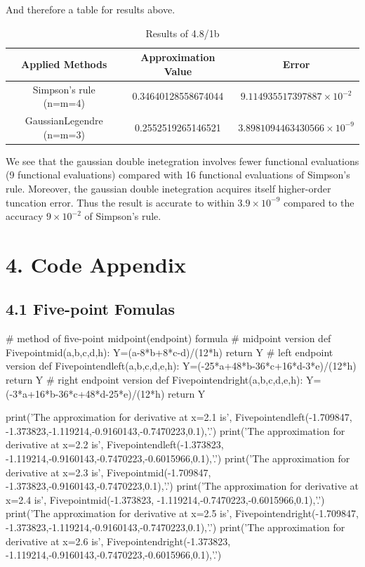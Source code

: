 \documentclass{article}
\begin{document}
    And therefore a table for results above. 

    \begin{table}[htbp]
    \centering
    \caption{Results of 4.8/1b}
    \begin{tabular}{c|c|c}
    \toprule
    \textbf{Applied Methods} & \textbf{Approximation Value } & \textbf{Error}\\ 
    \midrule
    Simpson's rule (n=m=4)& 0.34640128558674044 &$9.114935517397887 \times 10^{-2}$\\
    GaussianLegendre (n=m=3)&0.2552519265146521& $3.8981094463430566\times 10^{-9}$\\
    \bottomrule
    \end{tabular}
    \end{table}

    We see that the gaussian double inetegration involves fewer functional evaluations (9 functional evaluations) compared with 16 functional evaluations of Simpson's rule. Moreover, the gaussian double inetegration acquires itself higher-order tuncation error. Thus the result is accurate to within $3.9\times 10^{-9}$ compared to the accuracy $9\times 10^{-2}$ of Simpson's rule.

\section{4. Code Appendix}
    \subsection{4.1 Five-point Fomulas}
    \begin{python}
    # method of five-point midpoint(endpoint) formula
    # midpoint version
    def Fivepointmid(a,b,c,d,h):
        Y=(a-8*b+8*c-d)/(12*h)
        return Y
    # left endpoint version
    def Fivepointendleft(a,b,c,d,e,h):
        Y=(-25*a+48*b-36*c+16*d-3*e)/(12*h)
        return Y
    # right endpoint version
    def Fivepointendright(a,b,c,d,e,h):
        Y=(-3*a+16*b-36*c+48*d-25*e)/(12*h)
        return Y


    print('The approximation for derivative at x=2.1 is', Fivepointendleft(-1.709847,
    -1.373823,-1.119214,-0.9160143,-0.7470223,0.1),'.')
    print('The approximation for derivative at x=2.2 is', Fivepointendleft(-1.373823,
    -1.119214,-0.9160143,-0.7470223,-0.6015966,0.1),'.')
    print('The approximation for derivative at x=2.3 is', Fivepointmid(-1.709847,
    -1.373823,-0.9160143,-0.7470223,0.1),'.')
    print('The approximation for derivative at x=2.4 is', Fivepointmid(-1.373823,
    -1.119214,-0.7470223,-0.6015966,0.1),'.')
    print('The approximation for derivative at x=2.5 is', Fivepointendright(-1.709847,
    -1.373823,-1.119214,-0.9160143,-0.7470223,0.1),'.')
    print('The approximation for derivative at x=2.6 is', Fivepointendright(-1.373823,
    -1.119214,-0.9160143,-0.7470223,-0.6015966,0.1),'.')
    \end{python}
\end{document}
